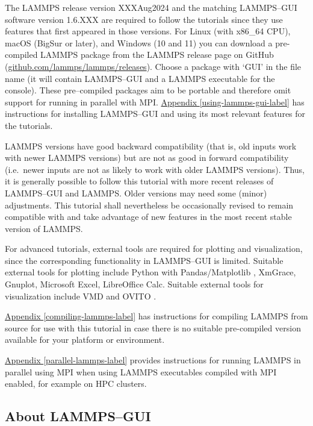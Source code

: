 \documentclass[9pt,tutorial]{livecoms}
\begin{document}
The LAMMPS release version XXXAug2024 \cite{lammps_code} and the
matching LAMMPS--GUI software version 1.6.XXX are required to follow the
tutorials since they use features that first appeared in those versions.
For Linux (with x86\_64 CPU), macOS (BigSur or later), and Windows (10
and 11) you can download a pre-compiled LAMMPS package from the LAMMPS
release page on GitHub
(\href{https://github.com/lammps/lammps/releases}{github.com/lammps/lammps/releases}).
Choose a package with `GUI' in the file name (it will contain
LAMMPS--GUI and a LAMMPS executable for the console).  These
pre--compiled packages aim to be portable and therefore omit support for
running in parallel with MPI. \hyperref[using-lammps-gui]{Appendix
  \ref{using-lammps-gui-label}} has instructions for installing
LAMMPS--GUI and using its most relevant features for the
tutorials.

LAMMPS versions have good backward compatibility (that is, old inputs
work with newer LAMMPS versions) but are not as good in forward
compatibility (i.e.~newer inputs are not as likely to work with older
LAMMPS versions).  Thus, it is generally possible to follow this
tutorial with more recent releases of LAMMPS--GUI and LAMMPS.  Older
versions may need some (minor) adjustments.  This tutorial shall
nevertheless be occasionally revised to remain compatible with and take
advantage of new features in the most recent stable version of LAMMPS.

For advanced tutorials, external tools are required for plotting and
visualization, since the corresponding functionality in LAMMPS--GUI is
limited.  Suitable external tools for plotting include Python with
Pandas/Matplotlib \cite{van1995python,hunter2007Matplotlib}, XmGrace,
Gnuplot, Microsoft Excel, LibreOffice Calc.  Suitable external tools for
visualization include VMD \cite{vmd_home,humphrey1996vmd} and OVITO
\cite{ovito_home,ovito_paper}.

\hyperref[compiling-lammps-label]{Appendix \ref{compiling-lammps-label}}
has instructions for compiling LAMMPS from source for use with this
tutorial in case there is no suitable pre-compiled version available
for your platform or environment.

\hyperref[parallel-lammps-label]{Appendix \ref{parallel-lammps-label}}
provides instructions for running LAMMPS in parallel using MPI when
using LAMMPS executables compiled with MPI enabled, for example on HPC
clusters.

\subsection{About LAMMPS--GUI}
\end{document}
